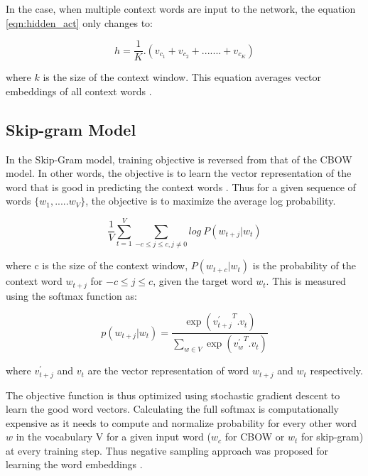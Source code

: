 In the case, when multiple context words are input to the network, the equation \ref{eqn:hidden_act} only changes to:

\begin{equation}
h= \frac {1}{K} .(v_{c_1}+v_{c_2}+.......+v_{c_K}) 
\end{equation}    

where $k$ is the size of the context window. This equation averages vector embeddings of all context words \cite{w2v:parameter_learning}.

\subsection{Skip-gram Model}

In the Skip-Gram model, training objective is reversed from that of the CBOW model. In other words, the objective is to learn the vector representation of the word that is good in predicting the context words \cite{w2v:mikolov_2013_distributed}. Thus for a given sequence of words $\{w_1,.....w_V\}$, the objective is to maximize the average log probability. 

\begin{equation}
\frac {1}{V}\sum_{t=1}^{V} \sum_{{-c \leq j \leq c},{j \neq 0}} {log\ P(w_{t+j}|w_t)}
\end{equation}

where c is the size of the context window, $P(w_{t+c}|w_t)$ is the probability of the context word $w_{t+j}$ for $-c \leq j \leq c$, given the target word $w_t$. This is measured using the softmax function as:

\begin{equation} \label{eqn:sg_prob}
p(w_{t+j}|w_t)=\frac {\exp({{v^{'}_{t+j}}^{T}}.{v_t})}{\sum_{w {\in}V} \exp({{v^{'}_{w}}^{T}}.{v_t})}
\end{equation}

\noindent where ${v^{'}_{t+j}}$ and ${v_t}$ are the vector representation of word $w_{t+j}$ and $w_{t}$ respectively.

The objective function is thus optimized using stochastic gradient descent to learn the good word vectors. Calculating the full softmax is computationally expensive as it needs to compute and normalize probability for every other word $w$ in the vocabulary V for a given input word ($w_{c}$ for CBOW or $w_{t}$ for skip-gram) at every training step. Thus negative sampling approach was proposed for learning the word embeddings \cite{w2v:mikolov_2013_distributed}.

